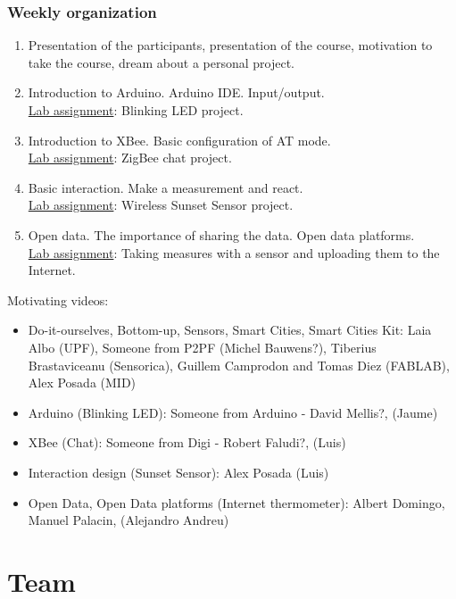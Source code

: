 \documentclass[a4paper,oneside]{book}   %
\begin{document}
\subsection{Weekly organization}
\begin{enumerate}
\item Presentation of the participants, presentation of the course, motivation to take the course, dream about a personal project.
\item Introduction to Arduino. Arduino IDE. Input/output. \\\underline{Lab assignment}: Blinking LED project.
\item Introduction to XBee. Basic configuration of AT mode. \\\underline{Lab assignment}: ZigBee chat project.
\item Basic interaction. Make a measurement and react. \\\underline{Lab assignment}: Wireless Sunset Sensor project.
\item Open data. The importance of sharing the data. Open data platforms. \\\underline{Lab assignment}: Taking measures with a sensor and uploading them to the Internet.
\end{enumerate}

Motivating videos:
\begin{itemize}
\item Do-it-ourselves, Bottom-up, Sensors, Smart Cities, Smart Cities Kit:
Laia Albo (UPF), Someone from P2PF (Michel Bauwens?), Tiberius Brastaviceanu (Sensorica), Guillem Camprodon and Tomas Diez (FABLAB), Alex Posada (MID)

\item Arduino (Blinking LED):
Someone from Arduino - David Mellis?, (Jaume)

\item XBee (Chat):
Someone from Digi - Robert Faludi?, (Luis)

\item Interaction design (Sunset Sensor):
Alex Posada (Luis)

\item Open Data, Open Data platforms (Internet thermometer):
Albert Domingo, Manuel Palacin, (Alejandro Andreu)
\end{itemize}



\chapter{Team}
\end{document}

